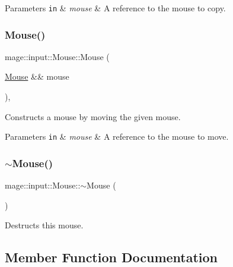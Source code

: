 \begin{DoxyParams}[1]{Parameters}
\mbox{\tt in}  & {\em mouse} & A reference to the mouse to copy. \\
\hline
\end{DoxyParams}
\hypertarget{classmage_1_1input_1_1_mouse_a6e8185b9b2f0fdcd63a191389eb2b050}{}\label{classmage_1_1input_1_1_mouse_a6e8185b9b2f0fdcd63a191389eb2b050} 
\subsubsection{\texorpdfstring{Mouse()}{Mouse()}\hspace{0.1cm}{\footnotesize\ttfamily [3/3]}}
{\footnotesize\ttfamily mage\+::input\+::\+Mouse\+::\+Mouse (\begin{DoxyParamCaption}\item[{\hyperlink{classmage_1_1input_1_1_mouse}{Mouse} \&\&}]{mouse }\end{DoxyParamCaption})\hspace{0.3cm}{\ttfamily [default]}, {\ttfamily [noexcept]}}

Constructs a mouse by moving the given mouse.


\begin{DoxyParams}[1]{Parameters}
\mbox{\tt in}  & {\em mouse} & A reference to the mouse to move. \\
\hline
\end{DoxyParams}
\hypertarget{classmage_1_1input_1_1_mouse_abfc6391c896b029e38ffa1341dcf9963}{}\label{classmage_1_1input_1_1_mouse_abfc6391c896b029e38ffa1341dcf9963} 
\subsubsection{\texorpdfstring{$\sim$\+Mouse()}{~Mouse()}}
{\footnotesize\ttfamily mage\+::input\+::\+Mouse\+::$\sim$\+Mouse (\begin{DoxyParamCaption}{ }\end{DoxyParamCaption})\hspace{0.3cm}{\ttfamily [default]}}

Destructs this mouse. 

\subsection{Member Function Documentation}
\hypertarget{classmage_1_1input_1_1_mouse_a6f789e976d80c6f9c92388e3cf3502d6}{}\label{classmage_1_1input_1_1_mouse_a6f789e976d80c6f9c92388e3cf3502d6} 
